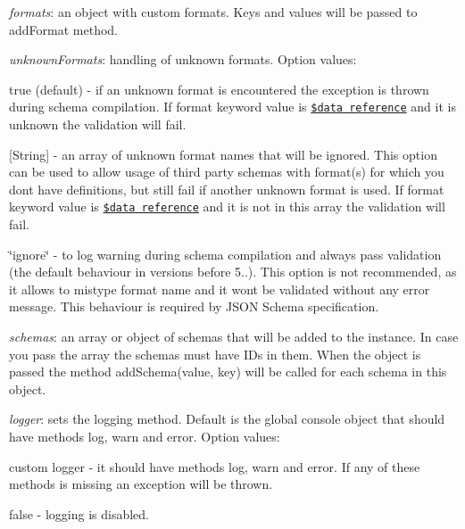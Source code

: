 \begin{DoxyItemize}
\item {\itshape formats}\+: an object with custom formats. Keys and values will be passed to {\ttfamily add\+Format} method.
\item {\itshape unknown\+Formats}\+: handling of unknown formats. Option values\+:
\begin{DoxyItemize}
\item {\ttfamily true} (default) -\/ if an unknown format is encountered the exception is thrown during schema compilation. If {\ttfamily format} keyword value is \href{#data-reference}{\tt \$data reference} and it is unknown the validation will fail.
\item {\ttfamily \mbox{[}String\mbox{]}} -\/ an array of unknown format names that will be ignored. This option can be used to allow usage of third party schemas with format(s) for which you don\textquotesingle{}t have definitions, but still fail if another unknown format is used. If {\ttfamily format} keyword value is \href{#data-reference}{\tt \$data reference} and it is not in this array the validation will fail.
\item {\ttfamily \char`\"{}ignore\char`\"{}} -\/ to log warning during schema compilation and always pass validation (the default behaviour in versions before 5..). This option is not recommended, as it allows to mistype format name and it won\textquotesingle{}t be validated without any error message. This behaviour is required by J\+S\+ON Schema specification.
\end{DoxyItemize}
\item {\itshape schemas}\+: an array or object of schemas that will be added to the instance. In case you pass the array the schemas must have I\+Ds in them. When the object is passed the method {\ttfamily add\+Schema(value, key)} will be called for each schema in this object.
\item {\itshape logger}\+: sets the logging method. Default is the global {\ttfamily console} object that should have methods {\ttfamily log}, {\ttfamily warn} and {\ttfamily error}. Option values\+:
\begin{DoxyItemize}
\item custom logger -\/ it should have methods {\ttfamily log}, {\ttfamily warn} and {\ttfamily error}. If any of these methods is missing an exception will be thrown.
\item {\ttfamily false} -\/ logging is disabled.
\end{DoxyItemize}
\end{DoxyItemize}

